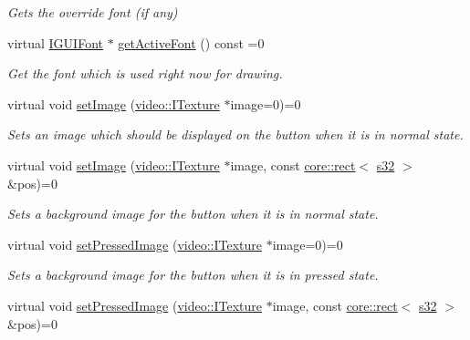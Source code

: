 \begin{DoxyCompactItemize}
\begin{DoxyCompactList}\small\item\em Gets the override font (if any) \end{DoxyCompactList}\item 
virtual \hyperlink{classirr_1_1gui_1_1IGUIFont}{I\+G\+U\+I\+Font} $\ast$ \hyperlink{classirr_1_1gui_1_1IGUIButton_a1caa9253c284c3e3366733bf7805d762}{get\+Active\+Font} () const =0
\begin{DoxyCompactList}\small\item\em Get the font which is used right now for drawing. \end{DoxyCompactList}\item 
virtual void \hyperlink{classirr_1_1gui_1_1IGUIButton_af233578beb34ba115b0197731e34a3f1}{set\+Image} (\hyperlink{classirr_1_1video_1_1ITexture}{video\+::\+I\+Texture} $\ast$image=0)=0
\begin{DoxyCompactList}\small\item\em Sets an image which should be displayed on the button when it is in normal state. \end{DoxyCompactList}\item 
virtual void \hyperlink{classirr_1_1gui_1_1IGUIButton_a205490ec6b4978afe9d3f6a4aed92b50}{set\+Image} (\hyperlink{classirr_1_1video_1_1ITexture}{video\+::\+I\+Texture} $\ast$image, const \hyperlink{classirr_1_1core_1_1rect}{core\+::rect}$<$ \hyperlink{namespaceirr_ac66849b7a6ed16e30ebede579f9b47c6}{s32} $>$ \&pos)=0
\begin{DoxyCompactList}\small\item\em Sets a background image for the button when it is in normal state. \end{DoxyCompactList}\item 
virtual void \hyperlink{classirr_1_1gui_1_1IGUIButton_a10389917530aa2f4a3008330c0695aad}{set\+Pressed\+Image} (\hyperlink{classirr_1_1video_1_1ITexture}{video\+::\+I\+Texture} $\ast$image=0)=0
\begin{DoxyCompactList}\small\item\em Sets a background image for the button when it is in pressed state. \end{DoxyCompactList}\item 
virtual void \hyperlink{classirr_1_1gui_1_1IGUIButton_a08019647ec3e08984d795b3c564d457e}{set\+Pressed\+Image} (\hyperlink{classirr_1_1video_1_1ITexture}{video\+::\+I\+Texture} $\ast$image, const \hyperlink{classirr_1_1core_1_1rect}{core\+::rect}$<$ \hyperlink{namespaceirr_ac66849b7a6ed16e30ebede579f9b47c6}{s32} $>$ \&pos)=0

\end{DoxyCompactItemize}
